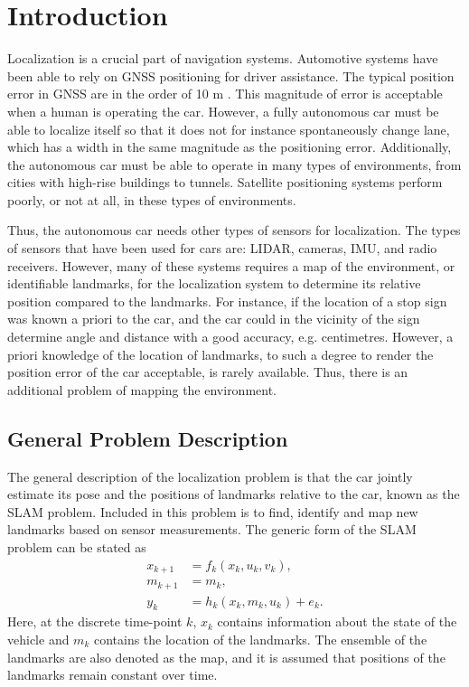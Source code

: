 \section{Introduction}

Localization is a crucial part of navigation systems. Automotive
systems have been able to rely on \gls{GNSS} positioning for driver assistance. 
The typical position error in \gls{GNSS} are in the
order of 10 m \cite{4770175}. This magnitude of error is acceptable when a human is operating the car.
However, a fully autonomous car must be able to localize itself so that it does not for instance spontaneously change lane, which has a width in the same magnitude as the positioning error. Additionally, the autonomous car must be able to operate in many types of environments, from cities with high-rise buildings to tunnels. Satellite positioning systems perform poorly, or not at all, in these types of environments. 

Thus, the autonomous car needs other types of sensors for localization. The types of sensors that have been used for cars are: \gls{LIDAR}, cameras, \gls{IMU}, and radio receivers. However, many of these systems requires a map of the environment, or identifiable landmarks, for the localization system to determine its relative position compared to the landmarks. For instance, if the location of a stop sign was known a priori to the car, and the car could in the vicinity of the sign determine angle and distance with a good accuracy, e.g. centimetres. However, a priori knowledge of the location of landmarks, to such a degree to render the position error of the car acceptable, is rarely available. Thus, there is an additional problem of mapping the environment.

\subsection{General Problem Description}

The general description of the localization problem is that the car
jointly estimate its pose and the positions of landmarks relative to
the car, known as the \gls{SLAM} problem. Included in this problem is
to find, identify and map new landmarks based on sensor
measurements. The generic form of the \gls{SLAM} problem can be stated
as
\begin{subequations}
  \begin{align}
    x_{k+1} & = f_k(x_k, u_k,v_k), \\
    m_{k+1} & = m_k, \\
    y_k & = h_k(x_k, m_k, u_k) + e_k.
  \end{align}
\end{subequations}
Here, at the discrete time-point $k$, $x_k$ contains information about
the state of the vehicle and $m_k$ contains the location of the
landmarks. The ensemble of the landmarks are also denoted as the map,
and it is assumed that positions of the landmarks remain constant over
time.

